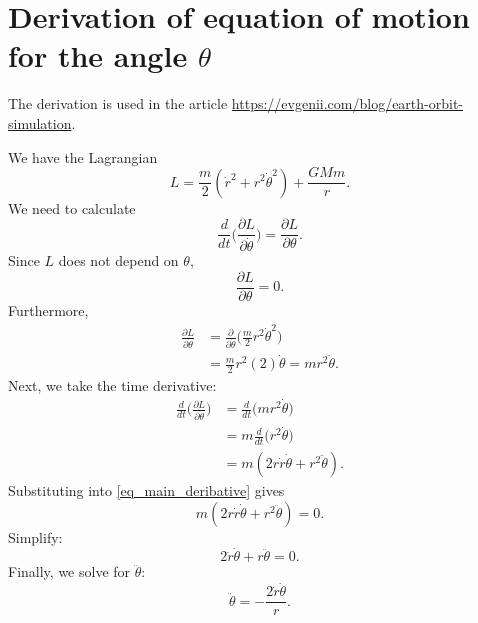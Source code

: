 \documentclass[a4paper,twoside,12pt,hidelinks]{article}
\begin{document}
\thispagestyle{empty}

\section*{Derivation of equation of motion for the angle $\theta$}

The derivation is used in the article \href{https://evgenii.com/blog/earth-orbit-simulation/}{https://evgenii.com/blog/earth-orbit-simulation}.

We have the Lagrangian
\begin{equation*}
  L = \frac{m}{2} (\dot{r}^2 + r^2 \dot{\theta}^2) + \frac{G M m}{r}.
\end{equation*}
We need to calculate
\begin{equation}
  \frac{d}{dt} \Big( \frac{\partial L}{\partial \dot{\theta}} \Big) = \frac{\partial L}{\partial \theta}.
  \label{eq_main_deribative}
\end{equation}
Since $L$ does not depend on $\theta$,
\[
  \frac{\partial L}{\partial \theta} = 0.
\]
Furthermore,
\begin{align*}
   \frac{\partial L}{\partial \dot{\theta}} &= \frac{\partial }{\partial \dot{\theta}} \Big( \frac{m}{2} r^2 \dot{\theta}^2 \Big) \\
    &= \frac{m}{2} r^2 (2) \dot{\theta} = m r^2 \dot{\theta}.
\end{align*}
Next, we take the time derivative:
\begin{align*}
   \frac{d}{dt} \Big( \frac{\partial L}{\partial \dot{\theta}} \Big) &= \frac{d}{dt} \Big( m r^2 \dot{\theta} \Big) \\
    &= m \frac{d}{dt} \Big( r^2 \dot{\theta} \Big) \\
    &= m (2 r \dot{r} \dot{\theta} + r^2 \ddot{\theta}). \tag{Product rule}
\end{align*}
Substituting into \autoref{eq_main_deribative} gives
\[
  m ( 2 r \dot{r} \dot{\theta} + r^2 \ddot{\theta} ) = 0.
\]
Simplify:
\[
  2 \dot{r} \dot{\theta} + r \ddot{\theta} = 0.
\]
Finally, we solve for $\ddot{\theta}$:
\[
  \ddot{\theta} = - \frac{2 \dot{r} \dot{\theta}}{r}.
\]
\end{document}
